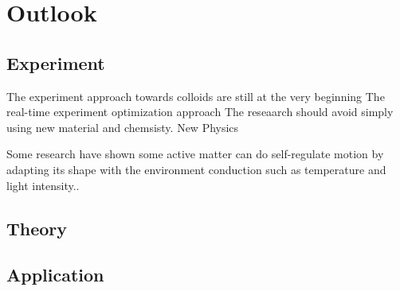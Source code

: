 \chapter{Outlook}
\section{Experiment}
The experiment approach towards colloids are still at the very beginning 
The real-time experiment optimization approach
The reseaarch should avoid simply using new material and chemsisty.
New Physics 

Some research have shown some active matter can do self-regulate motion by adapting its shape with the environment conduction such as temperature and light intensity.\cite{tu2017self,li2018light}.
\section{Theory}
\section{Application}